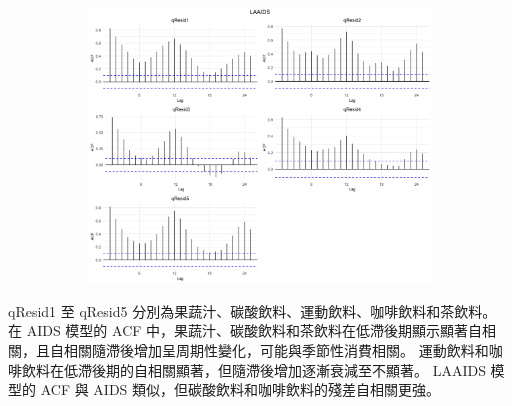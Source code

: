 \begin{figure}[H]
\begin{center}
\begin{subfigure}[b]{0.65\textwidth}
			\includegraphics[width=\textwidth]{../outcome/LAAIDS_plot_qResid.png}
		\end{subfigure}
	\end{center}
\end{figure}
\vspace{-3em}
\begin{singlespace}
		\begin{footnotesize}
				 qResid1 至 qResid5 分別為果蔬汁、碳酸飲料、運動飲料、咖啡飲料和茶飲料。
				在 AIDS 模型的 ACF 中，果蔬汁、碳酸飲料和茶飲料在低滯後期顯示顯著自相關，且自相關隨滯後增加呈周期性變化，可能與季節性消費相關。
				運動飲料和咖啡飲料在低滯後期的自相關顯著，但隨滯後增加逐漸衰減至不顯著。
				LAAIDS 模型的 ACF 與 AIDS 類似，但碳酸飲料和咖啡飲料的殘差自相關更強。
		\end{footnotesize}
\end{singlespace}






